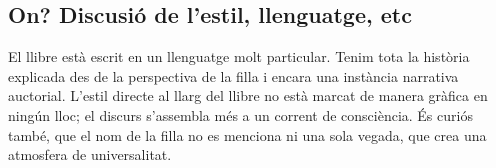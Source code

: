 \begin{comment}
[Penny2014]

"How are men supposed to cope with this loss of power in a society that still insists that the only way to be a man is to grab as much power as possible, to be rich, to be capable of extreme violence, to dominate other men physically and to dominate women sexually and emotionally? The received wisdom is that they're not supposed to cope. Without power over others, particularly over women, men are supposed to crumble, to lash out, to collapse in an extravagant welter of identity implosion that leaves a suspicious mess on the carpet." (p.64)

"'Patriarchy' does not mean 'the rule of men'. It means 'the rule of fathers' - literally, the rule of powerful heads of household over everybody else in society. Men further down the social chain were expected to be content with having power over women in order to make up for their lack of control over the rest of their lives.
[...]
Most individual men do not rule very much, and they never have. Most individual men don't have a lot of power, and now the small amount of social and sexual superiority they held over women is being questioned." (p.69-70)

"There are two big secrets about 'traditional masculine power' that mainstream culture does not want us to discuss, and it is imperative that we discuss them honestly [...]
The first big secret is this: most men have never really been powerful. Throughout human history, the vast majority of men have had almost no structural power, except over women and children. In fact, the power over women and children - technical and physical dominance within the sphere of one's own home - has been the sop offered to men who had almost no power outside of it." (p.75)

"Thus, a poor man working a job he hated could once expect to feel, at the very least, superior to his wife and children, to be master of his home even if he was treated like a slave outside it." (p.76)
\end{comment}

\subsection{On? Discusió de l'estil, llenguatge, etc}
El llibre està escrit en un llenguatge molt particular.
Tenim tota la història explicada des de la perspectiva de la filla i encara una instància narrativa auctorial.
L'estil directe al llarg del llibre no està marcat de manera gràfica en ningún lloc; el discurs s'assembla més a un corrent de consciència.
És curiós també, que el nom de la filla no es menciona ni una sola vegada, que crea una atmosfera de universalitat.


